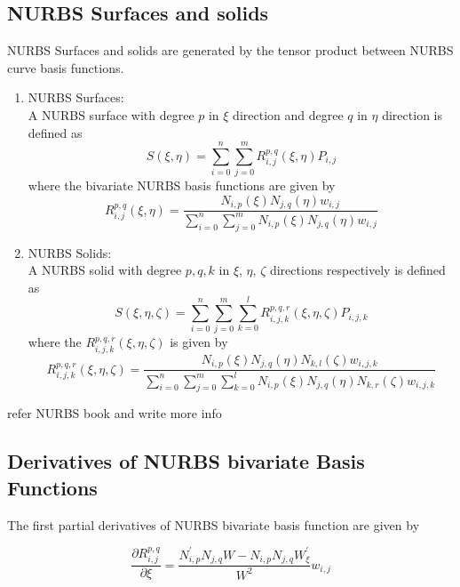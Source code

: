 \documentclass[11pt]{article}
\begin{document}
\subsection{NURBS Surfaces and solids }
NURBS Surfaces and solids are generated by the tensor product between NURBS
curve basis functions.
\begin{enumerate}[leftmargin=*]
	\item NURBS Surfaces: \\
	A NURBS surface with degree $p$ in $\xi$ direction and degree $q$ in $\eta$
	direction is defined as
	\begin{equation}
	S(\xi,\eta) = \sum_{i=0}^{n}\sum_{j=0}^{m} R_{i,j}^{p,q}(\xi,\eta)  P_{i,j}
	\end{equation}
	where the bivariate NURBS basis functions are given by
	\begin{equation}
	R_{i,j}^{p,q}(\xi,\eta)  =
	\frac{N_{i,p}(\xi)N_{j,q}(\eta)w_{i,j}}{\sum_{i=0}^{n}\sum_{j=0}^{m}N_{i,p}(\xi)N_{j,q}(\eta)w_{i,j}}
	\end{equation}
	\item NURBS Solids: \\
	A NURBS solid with degree $p,q,k$ in $\xi$, $\eta$, $\zeta$ directions
	respectively is defined as
	\begin{equation}
	S(\xi,\eta,\zeta) = \sum_{i=0}^{n}\sum_{j=0}^{m}\sum_{k=0}^{l}
	R_{i,j,k}^{p,q,r}(\xi,\eta,\zeta)  P_{i,j,k}
	\end{equation}
	where the $R_{i,j,k}^{p,q,r}(\xi,\eta,\zeta)$ is given by
	\begin{equation}
	R_{i,j,k}^{p,q,r}(\xi,\eta,\zeta)  =
	\frac{N_{i,p}(\xi)N_{j,q}(\eta)N_{k,l}(\zeta)w_{i,j,k}}{\sum_{i=0}^{n}\sum_{j=0}^{m}
		\sum_{k=0}^{l} N_{i,p}(\xi)N_{j,q}(\eta)N_{k,r}(\zeta)w_{i,j,k}}
	\end{equation}
\end{enumerate}


refer NURBS book and write more info

\subsection{Derivatives of NURBS bivariate Basis Functions}
The first partial derivatives of NURBS bivariate basis function are given by

\begin{equation}
\frac{\partial R_{i,j}^{p,q}}{\partial \xi} = \frac{N^{'}_{i,p} N_{j,q} W -
	N_{i,p} N_{j,q} W^{'}_{\xi}}{W^2}w_{i,j}
\end{equation}
\end{document}
